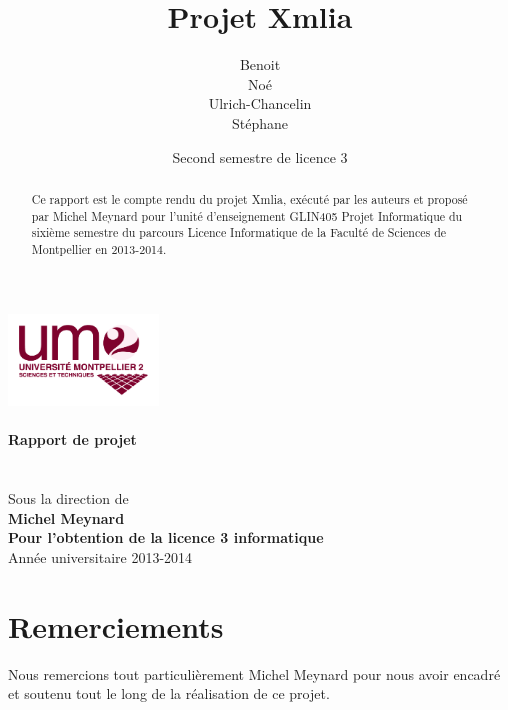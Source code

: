 \documentclass [a4 paper,11pt]{report}
\title {Projet Xmlia}
\author {
\bsc{BOIVIN} Benoit\\
\bsc{LE PHILIPPE} Noé\\
\bsc{KEGBA-SANGO-SANGO} Ulrich-Chancelin\\
\bsc{WOUTERS} Stéphane
}
\date{Second semestre de licence 3}
\begin{document}
\makeatletter
\begin{titlepage}
  \centering
  \vspace{1cm}
     \includegraphics[width=0.3\textwidth]{images/logo_um2.png}\\
    \vspace{1cm}
      {\large\textbf{	\@date\\
       Rapport de projet}}\\
    \vfill
       {\LARGE \textbf{\@title}} \\
    \vspace{2em}
        {\large \@author} \\
    \vfill
    Sous la direction de\\
    {\textbf{Michel Meynard}} \\
    \vfill
       {\textbf{Pour l'obtention de la licence 3 informatique}} \\
       Année universitaire 2013-2014 \\
\end{titlepage}
\makeatother
\thispagestyle{empty}
\begin{abstract}
Ce rapport est le compte rendu du projet Xmlia, exécuté par les auteurs et proposé par Michel Meynard pour l’unité d’enseignement GLIN405 Projet Informatique du sixième semestre du parcours Licence Informatique de la Faculté de Sciences de Montpellier en 2013-2014.
\end{abstract}

\chapter*{Remerciements}
Nous remercions tout particulièrement Michel Meynard pour nous avoir encadré et soutenu tout le long de la réalisation de ce projet.

\tableofcontents








\end{document}
